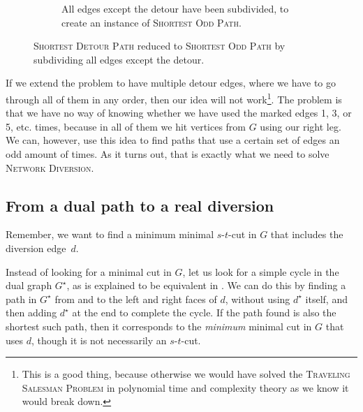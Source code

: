 \begin{figure}[H]
\begin{subfigure}{.45\textwidth}
{
        }
        \caption{All edges except the detour have been subdivided, to create an instance of \textsc{Shortest Odd Path}.}
        \label{figure:subdivided-detour}
    \end{subfigure}%
    \caption{\textsc{Shortest Detour Path} reduced to \textsc{Shortest Odd Path} by subdividing all edges except the detour.}
    \label{figure:subdividing-detours}
\end{figure}

If we extend the problem to have multiple detour edges, where we have to go through all of them in any order, then our idea will not work\footnote{This is a good thing, because otherwise we would have solved the \textsc{Traveling Salesman Problem} in polynomial time and complexity theory as we know it would break down.}.
The problem is that we have no way of knowing whether we have used the marked edges 1, 3, or 5, etc. times, because in all of them we hit vertices from $G$ using our right leg. We can, however, use this idea to find paths that use a certain set of edges an odd amount of times. As it turns out, that is exactly what we need to solve \textsc{Network Diversion}.

\subsection{From a dual path to a real diversion}
Remember, we want to find a minimum minimal $s$-$t$-cut in $G$ that includes the diversion edge~$d$.

Instead of looking for a minimal cut in $G$, let us look for a simple cycle in the dual graph $G^\star$, as is explained to be equivalent in . We can do this by finding a path in $G^\star$ from and to the left and right faces of $d$, without using $d^\star$ itself, and then adding $d^\star$ at the end to complete the cycle. If the path found is also the shortest such path, then it corresponds to the \emph{minimum} minimal cut in $G$ that uses $d$, though it is not necessarily an $s$-$t$-cut.

